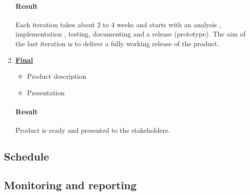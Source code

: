 \begin{enumerate}
	\paragraph{Result}
	Each iteration takes about 2 to 4 weeks and starts with an analysis , implementation , testing, documenting and a release (prototype). The aim of the last iteration is to deliver a fully working release of the product.
	
	\item \underline{\textbf{Final}}
	\begin{itemize}
		\item Product description
		\item Presentation
	\end{itemize}
	\paragraph{Result}
	Product is ready and presented to the stakeholders.
\end{enumerate}

\subsection{Schedule}

\subsection{Monitoring and reporting}
